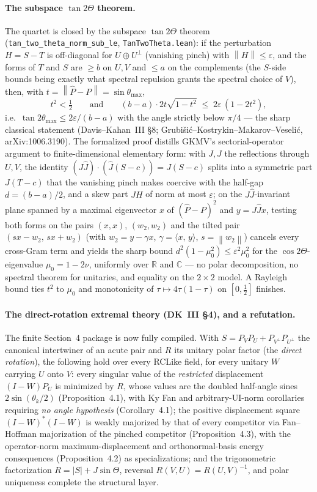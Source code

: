 \documentclass[11pt]{article}
\newcommand{\norm}[1]{\left\lVert #1\right\rVert}
\newcommand{\eps}{\varepsilon}
\newcommand{\inner}[2]{\langle #1,\,#2\rangle}
\theoremstyle{remark}
\begin{document}
\paragraph{The subspace $\tan2\Theta$ theorem.}  The quartet is closed by the
subspace $\tan2\Theta$ theorem (\texttt{tan\_two\_theta\_norm\_sub\_le},
\texttt{TanTwoTheta.lean}): if the perturbation $H=S-T$ is off-diagonal for
$U\oplus U^{\perp}$ (vanishing pinch) with $\norm{H}\le\eps$, and the forms of
$T$ and $S$ are $\ge b$ on $U,V$ and $\le a$ on the complements (the $S$-side
bounds being exactly what spectral repulsion grants the spectral choice of
$V$), then, with $t=\norm{\widehat P-P}=\sin\theta_{\max}$,
\[
  t^2<\tfrac12
  \qquad\text{and}\qquad
  (b-a)\cdot 2t\sqrt{1-t^2}\;\le\;2\eps\,(1-2t^2),
\]
i.e.\ $\tan2\theta_{\max}\le2\eps/(b-a)$ with the angle strictly below
$\pi/4$ --- the sharp classical statement (Davis--Kahan~III \S8;
Grubi\v{s}i\'c--Kostrykin--Makarov--Veseli\'c, arXiv:1006.3190).  The
formalized proof distills GKMV's sectorial-operator argument to
finite-dimensional elementary form: with $J,\widehat J$ the reflections
through $U,V$, the identity
$(J\widehat J)\cdot(\widehat J(S-c))=J(S-c)$ splits into a symmetric part
$J(T-c)$ that the vanishing pinch makes coercive with the half-gap
$d=(b-a)/2$, and a skew part $JH$ of norm at most $\eps$; on the
$J\widehat J$-invariant plane spanned by a maximal eigenvector $x$ of
$(\widehat P-P)^2$ and $y=J\widehat Jx$, testing both forms on the pairs
$(x,x)$, $(w_2,w_2)$ and the tilted pair $(sx-w_2,\,sx+w_2)$ (with
$w_2=y-\gamma x$, $\gamma=\inner{x}{y}$, $s=\norm{w_2}$) cancels every
cross-Gram term and yields the sharp bound
$d^2(1-\mu_0^2)\le\eps^2\mu_0^2$ for the $\cos2\Theta$-eigenvalue
$\mu_0=1-2\nu$, uniformly over $\mathbb R$ and $\mathbb C$ --- no polar decomposition, no
spectral theorem for unitaries, and equality on the $2\times2$ model.  A
Rayleigh bound ties $t^2$ to $\mu_0$ and monotonicity of
$\tau\mapsto4\tau(1-\tau)$ on $[0,\tfrac12]$ finishes.

\paragraph{The direct-rotation extremal theory (DK~III \S4), and a refutation.}
The finite Section~4 package is now fully compiled.  With
$S=P_VP_U+P_{V^\perp}P_{U^\perp}$ the canonical intertwiner of an acute pair
and $R$ its unitary polar factor (the \emph{direct rotation}), the following
hold over every RCLike field, for every unitary $W$ carrying $U$ onto $V$:
every singular value of the \emph{restricted} displacement $(I-W)P_U$ is
minimized by $R$, whose values are the doubled half-angle sines
$2\sin(\theta_k/2)$ (Proposition~4.1), with Ky Fan and arbitrary-UI-norm
corollaries requiring \emph{no angle hypothesis} (Corollary~4.1); the
positive displacement square $(I-W)^{*}(I-W)$ is weakly majorized by that of
every competitor via Fan--Hoffman majorization of the pinched competitor
(Proposition~4.3), with the operator-norm maximum-displacement and
orthonormal-basis energy consequences (Proposition~4.2) as specializations;
and the trigonometric factorization $R=|S|+J\sin\Theta$, reversal
$R(V,U)=R(U,V)^{-1}$, and polar uniqueness complete the structural layer.
\end{document}
